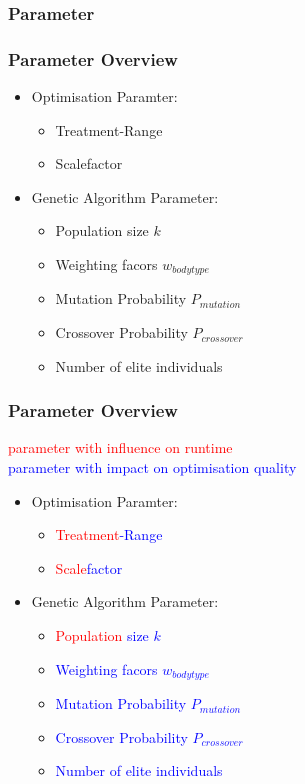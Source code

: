 \documentclass{beamer}
\begin{document}
\subsubsection{Parameter}
\begin{frame}
\frametitle{Parameter Overview}
	\begin{itemize}
	\item Optimisation Paramter:
		\begin{itemize}
		\item Treatment-Range
		\item Scalefactor
		\end{itemize}
	\item Genetic Algorithm Parameter:
		\begin{itemize}
		\item Population size $k$
		\item Weighting facors $w_{bodytype}$
		\item Mutation Probability $P_{mutation}$
		\item Crossover Probability $P_{crossover}$
		\item Number of elite individuals
		\end{itemize}
	\end{itemize}
 
 
\end{frame}

\begin{frame}
\frametitle{Parameter Overview}
\textcolor{red}{parameter with influence on runtime} \\
 \textcolor{blue}{parameter with impact on optimisation quality}  
	\begin{itemize}
	\item Optimisation Paramter:
		\begin{itemize}
		\item \textcolor{red}{Treatment}\textcolor{blue}{-Range}
		\item \textcolor{red}{Scale}\textcolor{blue}{factor}
		\end{itemize}
	\item Genetic Algorithm Parameter:
		\begin{itemize}
		\item \textcolor{red}{Population} \textcolor{blue}{size $k$}
		\item \textcolor{blue}{Weighting facors $w_{bodytype}$}
		\item \textcolor{blue}{Mutation Probability $P_{mutation}$}
		\item \textcolor{blue}{Crossover Probability $P_{crossover}$}
		\item \textcolor{blue}{Number of elite individuals}
		\end{itemize}
	\end{itemize}
 
 
\end{frame}
\end{document}
